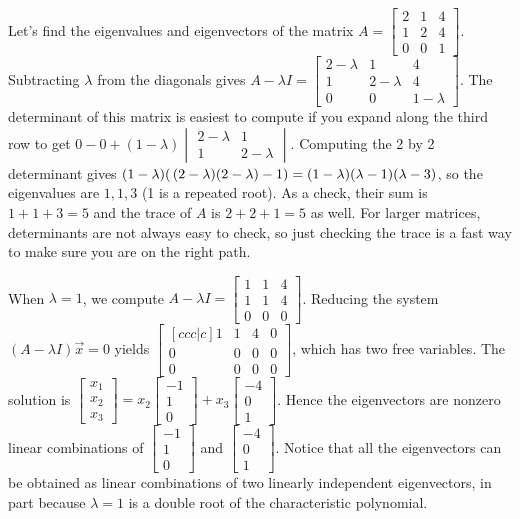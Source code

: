 {\begin{example}\label{eigenvalueexample3} \label{ex eigen2}
Let's find the eigenvalues and eigenvectors of the matrix 
$A=\begin{bmatrix}2&1&4\\ 1&2&4\\ 0&0&1\end{bmatrix}$. 
Subtracting $\lambda$ from the diagonals gives 
$A-\lambda I=\begin{bmatrix}2-\lambda&1&4\\ 1&2-\lambda&4\\ 0&0&1-\lambda\end{bmatrix}$. The determinant of this matrix is easiest to compute if you expand along the third row to get $0 - 0 + (1-\lambda) \begin{vmatrix} 2-\lambda&1\\1&2-\lambda\end{vmatrix}$. Computing the 2 by 2 determinant gives $(1-\lambda)(\thinspace(2-\lambda)(2-\lambda)-1) = (1-\lambda)(\lambda-1)(\lambda-3)$,  so the eigenvalues are $1,1,3$ (1 is a repeated root). As a check, their sum is $1+1+3=5$ and the trace of $A$ is $2+2+1=5$ as well. For larger matrices, determinants are not always easy to check, so just checking the trace is a fast way to make sure you are on the right path.

When $\lambda=1$, we compute $A-\lambda I =\begin{bmatrix}1&1&4\\ 1&1&4\\ 0&0&0\end{bmatrix} $. Reducing the system  $(A-\lambda I )\vec x=0$ yields $\begin{bmatrix}[ccc|c]1&1&4&0\\ 0&0&0&0\\ 0&0&0&0\end{bmatrix}$, which has two free variables. The solution is $\begin{bmatrix} x_1\\x_2\\ x_3\end{bmatrix} = x_2\begin{bmatrix} -1\\1\\0\end{bmatrix}+x_3\begin{bmatrix} -4\\0\\1\end{bmatrix} $. Hence the eigenvectors are nonzero linear combinations of $\begin{bmatrix} -1\\1\\0\end{bmatrix}$ and $\begin{bmatrix} -4\\0\\1\end{bmatrix}$. Notice that all the eigenvectors can be obtained as linear combinations of two linearly independent eigenvectors, in part because $\lambda =1$ is a double root of the characteristic polynomial. 


\end{example}}
